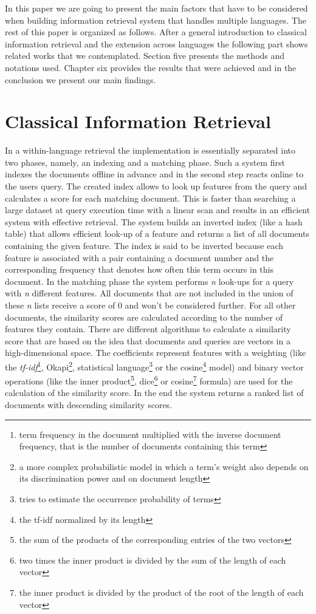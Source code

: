 \documentclass[journal]{IEEEtran}
\begin{document}
In this paper we are going to present the main factors that have to be considered when building information retrieval system that handles multiple languages.
The rest of this paper is organized as follows.
After a general introduction to classical information retrieval and the extension across languages the following part shows related works that we contemplated.
Section five presents the methods and notations used.
Chapter six provides the results that were achieved and in the conclusion we present our main findings.



\section{Classical Information Retrieval}
In a within-language retrieval the implementation is essentially separated into two phases, namely, an indexing and a matching phase.
Such a system first indexes the documents offline in advance and in the second step reacts online to the users query.
The created index allows to look up features from the query and calculates a score for each matching document.
This is faster than searching a large dataset at query execution time with a linear scan and results in an efficient system with effective retrieval.
The system builds an inverted index (like a hash table) that allows efficient look-up of a feature and returns a list of all documents containing the given feature.
The index is said to be inverted because each feature is associated with a pair containing a document number and the corresponding frequency that denotes how often this term occurs in this document.
In the matching phase the system performs \textit{n} look-ups for a query with \textit{n} different features.
All documents that are not included in the union of these \textit{n} lists receive a score of 0 and won't be considered further.
For all other documents, the similarity scores are calculated according to the number of features they contain.
There are different algorithms to calculate a similarity score that are based on the idea that documents and queries are vectors in a high-dimensional space.
The coefficients represent features with a weighting (like the \textit{tf-idf}\footnote{term frequency in the document multiplied with the inverse document frequency, that is the number of documents containing this term}, Okapi\footnote{a more complex probabilistic model in which a term's weight also depends on its discrimination power and on document length}, statistical language\footnote{tries to estimate the occurrence probability of terms} or the cosine\footnote{the tf-idf normalized by its length} model) and binary vector operations (like the inner product\footnote{the sum of the products of the corresponding entries of the two vectors}, dice\footnote{two times the inner product is divided by the sum of the length of each vector} or cosine\footnote{the inner product is divided by the product of the root of the length of each vector} formula) are used for the calculation of the similarity score.
In the end the system returns a ranked list of documents with descending similarity scores.
\end{document}
